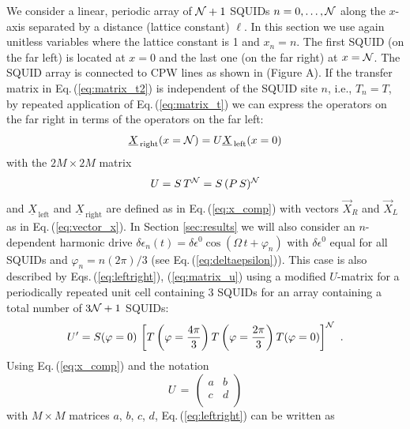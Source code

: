 \noindent
We consider a linear, periodic array of ${\cal N} + 1$ SQUIDs $n = 0, \ldots , {\cal N}$
along the $x$-axis separated by a distance (lattice constant) $\ell$. 
In this section we use again unitless variables 
where the lattice constant is 1 and $x_n = n$. The first SQUID (on the far left) is located 
at $x=0$ and the last one (on the far right) at $x = {\cal N}$. The SQUID array is 
connected to CPW lines as shown in 
%
\color{red}
(Figure A).
\color{black}
%
If the transfer matrix in Eq.\,(\ref{eq:matrix_t2}) is independent of the SQUID site $n$, 
i.e., $T_n = T$, by repeated application of Eq.\,(\ref{eq:matrix_t}) we can express the 
operators on the far right in terms of the operators on the far left:
%
\begin{equation} \label{eq:leftright}
\underline{X}_{\, \text{right}}(x={\cal N}) = U \underline{X}_{\,\text{left}}(x=0)
\end{equation}
%
with the $2M \times 2M$ matrix
%
\begin{equation} \label{eq:matrix_u}
U = S \, T^{\cal N} = S \, (P \, S)^{\cal N}
\end{equation}
%
and $\underline{X}_{\,\text{left}}$ and $\underline{X}_{\,\text{right}}$ are defined 
as in Eq.\,(\ref{eq:x_comp}) with vectors $\vec{X}_R$ and $\vec{X}_L$ as in 
Eq.\,(\ref{eq:vector_x}). In Section \ref{sec:results} we will also consider an
$n$-dependent harmonic drive 
$\delta \epsilon_n(t) = \delta \epsilon^0 \cos(\Omega \, t + \varphi_n)$
with $\delta \epsilon^0$ equal for all SQUIDs and
$\varphi_n = n (2 \pi) / 3$ (see Eq.\,(\ref{eq:deltaepsilon})).
This case is also described by Eqs.\,(\ref{eq:leftright}), (\ref{eq:matrix_u}) 
using a modified $U$-matrix for a periodically repeated unit 
cell containing 3 SQUIDs for an array containing a total number of $3 {\cal N} + 1$ SQUIDs:
%
\begin{equation} \label{eq:matrix_u2}
U' = S(\varphi=0) \, \left[T\left(\varphi =  \frac{4\pi}{3}  \right) T\left(\varphi =  \frac{2\pi}{3} \right) T(\varphi = 0) \right]^{\cal N} \, \, .
\end{equation}
%
\noindent
Using Eq.\,(\ref{eq:x_comp}) and the notation 
%
\begin{equation} \label{eq:abcd}
U \, = \,  
\begin{pmatrix}
a & b \\
c & d \\
\end{pmatrix}
\end{equation}
%
with $M \times M$ matrices $a$, $b$, $c$, $d$, 
Eq.\,(\ref{eq:leftright}) can be written as

